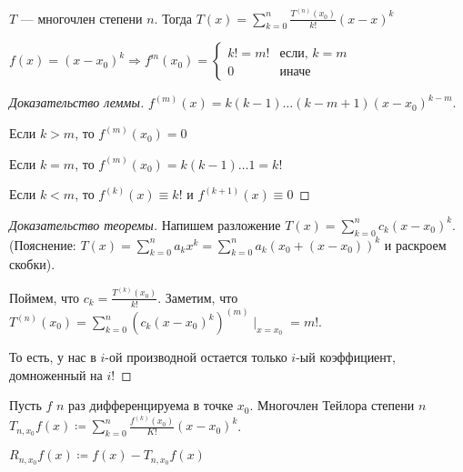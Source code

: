 \begin{theorem}
    $T$ --- многочлен степени  $n$. Тогда  $T(x) = \sum_{k=0}^n \frac{T^{(n)}(x_0)}{k!}(x - x)^k$
\end{theorem}
\begin{lemma}
    $f(x) = (x-x_0)^k \Rightarrow f^{m}(x_0) = \begin{cases} k! = m! & \text{если, }k=m \\ 0 & \text{иначе} \end{cases}$
\end{lemma}
\begin{proof}[Доказательство леммы]
    $f^{(m)}(x) = k(k-1)\ldots(k - m + 1)(x-x_0)^{k-m}$.

    Если $k > m$, то  $f^{(m)}(x_0) = 0$

    Если $k = m$, то  $f^{(m)}(x_0) = k(k-1)\ldots 1 = k!$

    Если $k < m$, то  $f^{(k)}(x) \equiv k!$ и  $f^{(k + 1)}(x) \equiv 0$
\end{proof}
\begin{proof}[Доказательство теоремы]
    Напишем разложение $T(x) = \sum_{k=0}^n c_k(x-x_0)^k$. (Пояснение: $T(x) = \sum_{k=0}^n a_k x^k = \sum_{k=0}^n a_k(x_0 + (x-x_0))^k$ и раскроем скобки).

    Поймем, что $c_k = \frac{T^{(k)}(x_0)}{k!}$. Заметим, что $T^{(n)}(x_0) = \sum_{k=0}^{n} (c_k(x-x_0)^k)^{(m)} \mid_{x=x_0} = m!$.

    То есть, у нас в $i$-ой производной остается только  $i$-ый коэффициент, домноженный на $i!$ 
\end{proof}
\begin{definition}
    Пусть $f$  $n$ раз дифференцируема в точке  $x_0$. Многочлен Тейлора степени $n$  $T_{n, x_0} f(x) \coloneqq \sum_{k=0}^n \frac{f^{(k)}(x_0)}{K!}(x-x_0)^k$.

    $R_{n, x_0}f(x) \coloneqq f(x) - T_{n, x_0}f(x)$
\end{definition}

